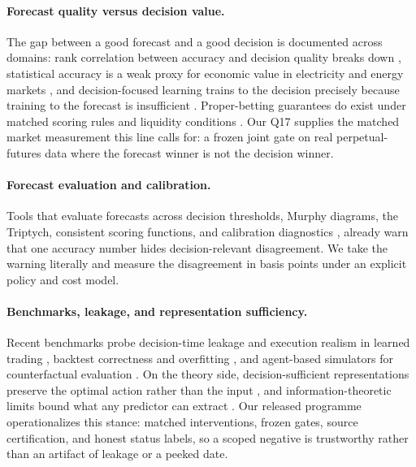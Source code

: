 \paragraph{Forecast quality versus decision value.} The gap between a good forecast and a
good decision is documented across domains: rank correlation between accuracy and decision
quality breaks down \citep{falezza2026when, raeth2025forecast}, statistical accuracy is a
weak proxy for economic value in electricity and energy markets
\citep{maciejowska2025statistical, kath2018value}, and decision-focused learning trains to
the decision precisely because training to the forecast is insufficient
\citep{wilder2018melding, zhou2024decision, silvestri2023score, tankov2021decision,
samuel2020information}. Proper-betting guarantees do exist under matched scoring rules and
liquidity conditions \citep{anri2026when}. Our Q17 supplies the matched market measurement
this line calls for: a frozen joint gate on real perpetual-futures data where the forecast
winner is not the decision winner.

\paragraph{Forecast evaluation and calibration.} Tools that evaluate forecasts across
decision thresholds, Murphy diagrams, the Triptych, consistent scoring functions, and
calibration diagnostics \citep{f2017murphy, timo2023evaluating, werner2015quantiles,
graziani2019probabilistic, loveday2023user, taggart2021point, allen2024tail,
bouallegue2015quantile}, already warn that one accuracy number hides decision-relevant
disagreement. We take the warning literally and measure the disagreement in basis points
under an explicit policy and cost model.

\paragraph{Benchmarks, leakage, and representation sufficiency.} Recent benchmarks probe
decision-time leakage and execution realism in learned trading
\citep{fan2026when, junyi2026beyond, nagy2025lob, cao2022dslob}, backtest correctness and
overfitting \citep{low2015correctness, koshiyama2019avoiding, pham2026algoxpert}, and
agent-based simulators for counterfactual evaluation \citep{dwarakanath2024abides,
backhouse2025painting}. On the theory side, decision-sufficient representations preserve the
optimal action rather than the input \citep{ye2026learning, walsh2026support}, and
information-theoretic limits bound what any predictor can extract
\citep{maurice2026forecastability}. Our released programme operationalizes this stance:
matched interventions, frozen gates, source certification, and honest status labels, so a
scoped negative is trustworthy rather than an artifact of leakage or a peeked date.
